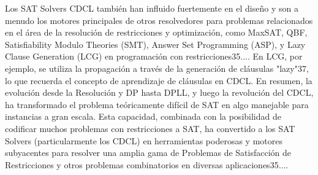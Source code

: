 Los SAT Solvers CDCL también han influido fuertemente en el diseño y son a menudo los motores principales de otros resolvedores para problemas relacionados en el área de la resolución de restricciones y optimización, como MaxSAT, QBF, Satisfiability Modulo Theories (SMT), Answer Set Programming (ASP), y Lazy Clause Generation (LCG) en programación con restricciones35.... En LCG, por ejemplo, se utiliza la propagación a través de la generación de cláusulas "lazy"37, lo que recuerda el concepto de aprendizaje de cláusulas en CDCL.
En resumen, la evolución desde la Resolución y DP hasta DPLL, y luego la revolución del CDCL, ha transformado el problema teóricamente difícil de SAT en algo manejable para instancias a gran escala. Esta capacidad, combinada con la posibilidad de codificar muchos problemas con restricciones a SAT, ha convertido a los SAT Solvers (particularmente los CDCL) en herramientas poderosas y motores subyacentes para resolver una amplia gama de Problemas de Satisfacción de Restricciones y otros problemas combinatorios en diversas aplicaciones35....

